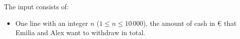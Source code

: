 
    The input consists of:
    \begin{itemize}
        \item One line with an integer $n$ ($1\leq n\leq 10\,000$), the amount of
    cash in € that Emilia and Alex want to withdraw in total.
    \end{itemize}
